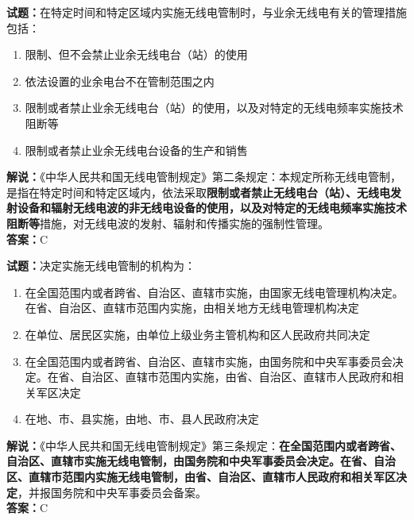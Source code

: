 \documentclass{ctexbook}
\begin{document}
\vspace{\baselineskip}

\noindent\textbf{试题：}在特定时间和特定区域内实施无线电管制时，与业余无线电有关的管理措施包括：
\begin{enumerate}[leftmargin=3em]
  \item 限制、但不会禁止业余无线电台（站）的使用
  \item 依法设置的业余电台不在管制范围之内
  \item 限制或者禁止业余无线电台（站）的使用，以及对特定的无线电频率实施技术阻断等
  \item 限制或者禁止业余无线电台设备的生产和销售
\end{enumerate}
\noindent\textbf{解说：}《中华人民共和国无线电管制规定》第二条规定：本规定所称无线电管制，是指在特定时间和特定区域内，依法采取\textbf{限制或者禁止无线电台（站）、无线电发射设备和辐射无线电波的非无线电设备的使用，以及对特定的无线电频率实施技术阻断等}措施，对无线电波的发射、辐射和传播实施的强制性管理。\\\noindent\textbf{答案：}C

\vspace{\baselineskip}

\noindent\textbf{试题：}决定实施无线电管制的机构为：
\begin{enumerate}[leftmargin=3em]
  \item 在全国范围内或者跨省、自治区、直辖市实施，由国家无线电管理机构决定。在省、自治区、直辖市范围内实施，由相关地方无线电管理机构决定
  \item 在单位、居民区实施，由单位上级业务主管机构和区人民政府共同决定
  \item 在全国范围内或者跨省、自治区、直辖市实施，由国务院和中央军事委员会决定。在省、自治区、直辖市范围内实施，由省、自治区、直辖市人民政府和相关军区决定
  \item 在地、市、县实施，由地、市、县人民政府决定
\end{enumerate}
\noindent\textbf{解说：}《中华人民共和国无线电管制规定》第三条规定：\textbf{在全国范围内或者跨省、自治区、直辖市实施无线电管制，由国务院和中央军事委员会决定。在省、自治区、直辖市范围内实施无线电管制，由省、自治区、直辖市人民政府和相关军区决定}，并报国务院和中央军事委员会备案。\\\noindent\textbf{答案：}C

\vspace{\baselineskip}
\end{document}
